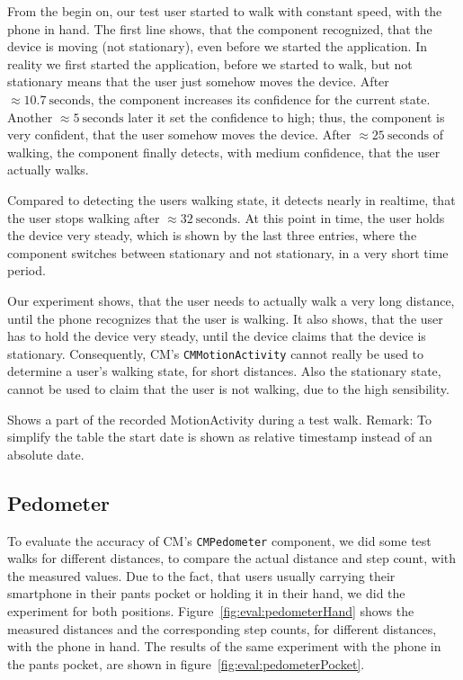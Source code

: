 From the begin on, our test user started to walk with constant speed, with the phone in hand. The first line shows, that the component recognized, that the device is moving (not stationary), even before we started the application. In reality we first started the application, before we started to walk, but not stationary means that the user just somehow moves the device. After $\approx 10.7~\text{seconds}$, the component increases its confidence for the current state. Another $\approx 5~\text{seconds}$ later it set the confidence to high; thus, the component is very confident, that the user somehow moves the device. After $\approx 25~\text{seconds}$ of walking, the component finally detects, with medium confidence, that the user actually walks.

Compared to detecting the users walking state, it detects nearly in realtime, that the user stops walking after $\approx 32~\text{seconds}$. At this point in time, the user holds the device very steady, which is shown by the last three entries, where the component switches between stationary and not stationary, in a very short time period.

Our experiment shows, that the user needs to actually walk a very long distance, until the phone recognizes that the user is walking. It also shows, that the user has to hold the device very steady, until the device claims that the device is stationary. Consequently, \ac{CM}'s \texttt{CMMotionActivity} cannot really be used to determine a user's walking state, for short distances. Also the stationary state, cannot be used to claim that the user is not walking, due to the high sensibility.

\begin{table}
	
	\caption{Shows a part of the recorded MotionActivity during a test walk. Remark: To simplify the table the start date is shown as relative timestamp instead of an absolute date.}
	\label{tab:motionActivityEvaluation}
\end{table}


\subsection{Pedometer}
To evaluate the accuracy of \ac{CM}'s \texttt{CMPedometer} component, we did some test walks for different distances, to compare the actual distance and step count, with the measured values. Due to the fact, that users usually carrying their smartphone in their pants pocket or holding it in their hand, we did the experiment for both positions. Figure~\ref{fig:eval:pedometerHand} shows the measured distances and the corresponding step counts, for different distances, with the phone in hand. The results of the same experiment with the phone in the pants pocket, are shown in figure~\ref{fig:eval:pedometerPocket}.


